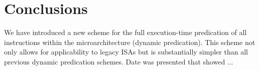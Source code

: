 %
%
\vspace{-0.25in}
\section{Conclusions}
\vspace{-0.15in}
%
We have introduced a new scheme for the full execution-time
predication of all instructions within the microarchitecture
(dynamic predication).
This scheme not only allows for applicability to legacy ISAs
but is substantially simpler than all previous
dynamic predication schemes.
Date was presented that showed ...
%
%
%



%
%
